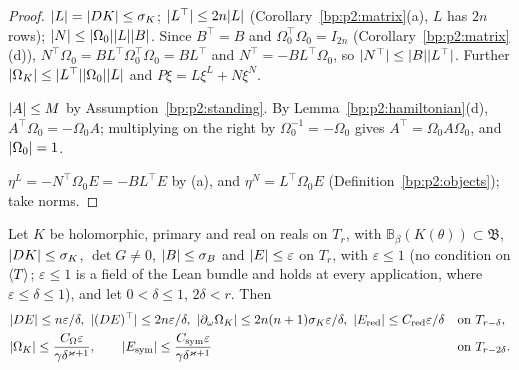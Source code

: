 \begin{proof}
\label{step:p2s:fb-frame}
$\lvert L\rvert=\lvert DK\rvert\le\sigma_K$; $\lvert L^\top\rvert\le2n\lvert L\rvert$ (Corollary~\ref{bp:p2:matrix}(a), $L$ has $2n$ rows);
$\lvert N\rvert\le\lvert \Omega_0\rvert\lvert L\rvert\lvert B\rvert$. Since $B^\top=B$ and $\Omega_0^\top\Omega_0=I_{2n}$ (Corollary~\ref{bp:p2:matrix}(d)),
$N^\top\Omega_0=BL^\top\Omega_0^\top\Omega_0=BL^\top$ and $N^\top=-BL^\top\Omega_0$, so $\lvert N^\top\rvert\le\lvert B\rvert\lvert L^\top\rvert$. Further
$\lvert \Omega_K\rvert\le\lvert L^\top\rvert\lvert \Omega_0\rvert\lvert L\rvert$ and $P\xi=L\xi^L+N\xi^N$.

\label{step:p2s:fb-a}
$\lvert A\rvert\le M$ by Assumption~\ref{bp:p2:standing}. By Lemma~\ref{bp:p2:hamiltonian}(d), $A^\top\Omega_0=-\Omega_0A$;
multiplying on the right by $\Omega_0^{-1}=-\Omega_0$ gives $A^\top=\Omega_0A\Omega_0$, and $\lvert \Omega_0\rvert=1$.

\label{step:p2s:fb-eta}
$\eta^L=-N^\top\Omega_0E=-BL^\top E$ by (a), and $\eta^N=L^\top\Omega_0E$ (Definition~\ref{bp:p2:objects}); take norms.
\end{proof}

\begin{lemma}\label{bp:p2s:geometry}
Let $K$ be holomorphic, primary and real on reals on $T_r$, with $\mathbb B_\beta(K(\theta))\subset\mathfrak B$,
$\lvert DK\rvert\le\sigma_K$, $\det G\ne0$, $\lvert B\rvert\le\sigma_B$ and $\lvert E\rvert\le\varepsilon$ on $T_r$, with $\varepsilon\le1$ (no condition on $\langle T\rangle$;
$\varepsilon\le1$ is a field of the Lean bundle  and holds at every application, where
$\varepsilon\le\delta\le1$), and let $0<\delta\le1$, $2\delta<r$. Then
\begin{align*}
&\abs{DE}\le n\varepsilon/\delta,\ \abs{(DE)^\top}\le2n\varepsilon/\delta,\ \abs{\partial_\omega\Omega_K}\le2n(n+1)\sigma_K\varepsilon/\delta,\
\abs{E_{\mathrm{red}}}\le C_{\mathrm{red}}\varepsilon/\delta&&\text{on }T_{r-\delta},\\
&\abs{\Omega_K}\le\frac{C_\Omega\varepsilon}{\gamma\delta^{\varkappa+1}},\qquad\abs{E_{\mathrm{sym}}}\le\frac{C_{\mathrm{sym}}\varepsilon}{\gamma\delta^{\varkappa+1}}&&\text{on }T_{r-2\delta}.
\end{align*}
\end{lemma}

